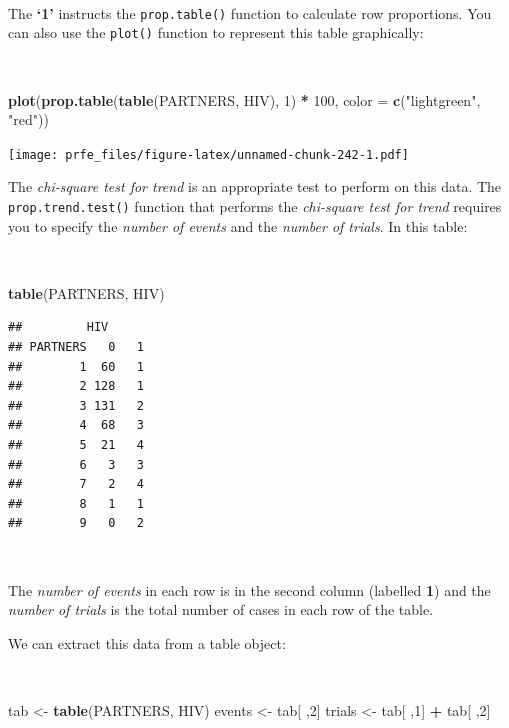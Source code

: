 \documentclass[12pt,a4paper]{book}
\newenvironment{Shaded}{\begin{snugshade}}{\end{snugshade}}
\newcommand{\KeywordTok}[1]{\textcolor[rgb]{0.13,0.29,0.53}{\textbf{#1}}}
\newcommand{\DataTypeTok}[1]{\textcolor[rgb]{0.13,0.29,0.53}{#1}}
\newcommand{\DecValTok}[1]{\textcolor[rgb]{0.00,0.00,0.81}{#1}}
\newcommand{\StringTok}[1]{\textcolor[rgb]{0.31,0.60,0.02}{#1}}
\newcommand{\OperatorTok}[1]{\textcolor[rgb]{0.81,0.36,0.00}{\textbf{#1}}}
\newcommand{\NormalTok}[1]{#1}
\theoremstyle{definition}
\theoremstyle{definition}
\theoremstyle{definition}
\theoremstyle{remark}
\begin{document}
~

The \textbf{`1'} instructs the \texttt{prop.table()} function to
calculate row proportions. You can also use the \texttt{plot()} function
to represent this table graphically:

~

\begin{Shaded}
\begin{Highlighting}[]
\KeywordTok{plot}\NormalTok{(}\KeywordTok{prop.table}\NormalTok{(}\KeywordTok{table}\NormalTok{(PARTNERS, HIV), }\DecValTok{1}\NormalTok{) }\OperatorTok{*}\StringTok{ }\DecValTok{100}\NormalTok{, }\DataTypeTok{color =} \KeywordTok{c}\NormalTok{(}\StringTok{"lightgreen"}\NormalTok{, }\StringTok{"red"}\NormalTok{))}
\end{Highlighting}
\end{Shaded}

\texttt{[image: prfe\_files/figure-latex/unnamed-chunk-242-1.pdf]}

\newpage

The \emph{chi-square test for trend} is an appropriate test to perform
on this data. The \texttt{prop.trend.test()} function that performs the
\emph{chi-square test for trend} requires you to specify the
\emph{number of events} and the \emph{number of trials}. In this table:

~

\begin{Shaded}
\begin{Highlighting}[]
\KeywordTok{table}\NormalTok{(PARTNERS, HIV)}
\end{Highlighting}
\end{Shaded}

\begin{verbatim}
##         HIV
## PARTNERS   0   1
##        1  60   1
##        2 128   1
##        3 131   2
##        4  68   3
##        5  21   4
##        6   3   3
##        7   2   4
##        8   1   1
##        9   0   2
\end{verbatim}

~

The \emph{number of events} in each row is in the second column
(labelled \textbf{1}) and the \emph{number of trials} is the total
number of cases in each row of the table.

We can extract this data from a table object:

~

\begin{Shaded}
\begin{Highlighting}[]
\NormalTok{tab <-}\StringTok{ }\KeywordTok{table}\NormalTok{(PARTNERS, HIV)}
\NormalTok{events <-}\StringTok{ }\NormalTok{tab[ ,}\DecValTok{2}\NormalTok{]}
\NormalTok{trials <-}\StringTok{ }\NormalTok{tab[ ,}\DecValTok{1}\NormalTok{] }\OperatorTok{+}\StringTok{ }\NormalTok{tab[ ,}\DecValTok{2}\NormalTok{]}
\end{Highlighting}
\end{Shaded}
\end{document}
